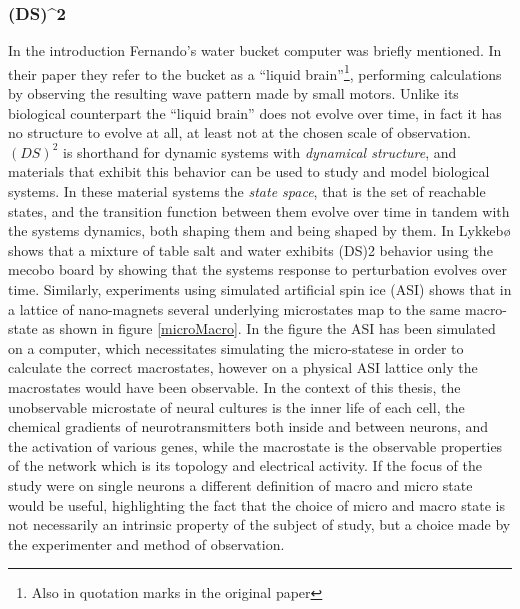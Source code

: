 \subsubsection{(DS)^2}
%
In the introduction Fernando's water bucket computer
\cite{FERNANDO2003} was briefly mentioned.
In their paper they refer to the bucket as a ``liquid brain''\footnote{Also in
  quotation marks in the original paper}, performing calculations by observing
the resulting wave pattern made by small motors.
Unlike its biological counterpart the ``liquid brain'' does not evolve over
time, in fact it has no structure to evolve at all, at least not at the chosen
scale of observation.
%
$(DS)^2$ is shorthand for dynamic systems with \emph{dynamical structure}\cite{Spicher2004}, and
materials that exhibit this behavior can be used to study and model biological
systems.
In these material systems the \emph{state space}, that is the set of reachable
states, and the transition function between them evolve over time in tandem with
the systems dynamics, both shaping them and being shaped by them.
%
In \cite{EIM_DS2_LYKKEBO} Lykkebø shows that a mixture of table salt and
water exhibits (DS)2 behavior using the mecobo board by showing that the systems
response to perturbation evolves over time.
%
Similarly, experiments using simulated artificial spin ice \cite{JENSEN_ASI} (ASI)
shows that in a lattice of nano-magnets several underlying microstates map to the
same macro-state as shown in figure \ref{microMacro}.
%
In the figure the ASI has been simulated on a computer, which necessitates
simulating the micro-statese in order to calculate the correct macrostates,
however on a physical ASI lattice only the macrostates would have been observable.
In the context of this thesis, the unobservable microstate of neural cultures is the
inner life of each cell, the chemical gradients of neurotransmitters both inside
and between neurons, and the activation of various genes, while the macrostate
is the observable properties of the network which is its topology and electrical
activity. 
If the focus of the study were on single neurons a different definition of macro
and micro state would be useful, highlighting the fact that the choice of micro
and macro state is not necessarily an intrinsic property of the subject of
study, but a choice made by the experimenter and method of observation.
